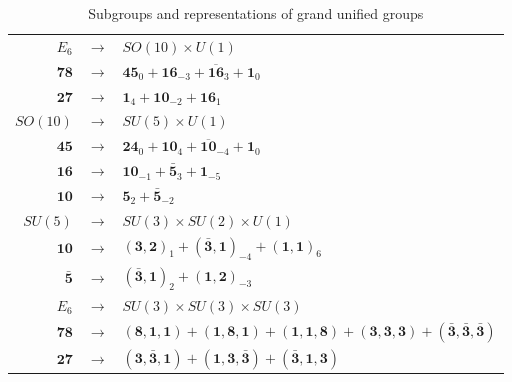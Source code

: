 \begin{table}[h]
	\caption{Subgroups and representations of grand unified groups}
	\label{tab:11.4}%
	\centering
	\begin{tabular}[c]{rcl}
		\hline\hline
		$E_{6}$ & $\to$ &  $SO(10)\times U(1)$  \\
		$\mathbf{78}$ &  $\to$ & $\mathbf{45}_{0}+\mathbf{16}_{-3}+\overline{\mathbf{16}}_{3}+\mathbf{1}_{0}$ \\
		$\mathbf{27}$ &  $\to$ & $\mathbf{1}_{4}+\mathbf{10}_{-2}+\mathbf{16}_{1}$ \\
		\hline
		$SO(10)$ & $\to$ &  $SU(5)\times U(1)$  \\
		$\mathbf{45}$ & $\to$ & $\mathbf{24}_{0}+\mathbf{10}_{4}+\overline{\mathbf{10}}_{-4}+\mathbf{1}_{0}$ \\
		$\mathbf{16}$ & $\to$ & $\mathbf{10}_{-1} + \bar{\mathbf{5}}_{3}+\mathbf{1}_{-5}$ \\
		$\mathbf{10}$ & $\to$ & $\mathbf{5}_{2}+\bar{\mathbf{5}}_{-2}$ \\
		\hline
		$SU(5)$ & $\to$ &  $SU(3)\times SU(2)\times U(1)$  \\
		$\mathbf{10}$ & $\to$ & $(\mathbf{3},\mathbf{2})_{1}+(\bar{\mathbf{3}},\mathbf{1})_{-4}
		+(\mathbf{1},\mathbf{1})_{6}$ \\
		$\bar{\mathbf{5}}$ & $\to$ & $(\bar{\mathbf{3}},\mathbf{1})_{2} + (\mathbf{1},\mathbf{2})_{-3}$ \\
		\hline
		$E_{6}$ & $\to$ &  $SU(3)\times SU(3)\times SU(3)$  \\
		$\mathbf{78}$ & $\to$ & $(\mathbf{8},\mathbf{1},\mathbf{1})+ (\mathbf{1},\mathbf{8},\mathbf{1}) 
		+(\mathbf{1},\mathbf{1},\mathbf{8}) + (\mathbf{3},\mathbf{3},\mathbf{3})
		+(\bar{\mathbf{3}},\bar{\mathbf{3}},\bar{\mathbf{3}}) $ \\
		$\mathbf{27}$ & $\to$ & $(\mathbf{3},\bar{\mathbf{3}},\mathbf{1}) + (\mathbf{1},\mathbf{3},\bar{\mathbf{3}})
		+(\bar{\mathbf{3}},\mathbf{1},\mathbf{3})$ \\
		\hline\hline
	\end{tabular}
\end{table}

